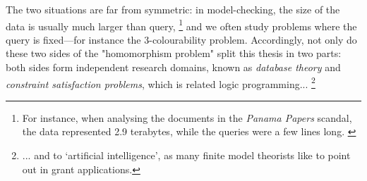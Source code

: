 The two situations are far from symmetric: in model-checking, the size of the
data is usually much larger than query,%
\footnote{For instance, when analysing the documents in the \emph{Panama Papers} scandal,
the data represented 2.9 terabytes, while the queries were a few lines long. \cite{Neo4jPanama}}
and we often study problems where
the query is fixed---for instance the 3-colourability problem.
Accordingly, not only do these two sides of the "homomorphism problem" split this thesis
in two parts: both sides form independent research domains, known as \emph{database theory}
and \emph{constraint satisfaction problems}, which is related logic programming...%
\footnote{... and to `artificial intelligence', as many finite model theorists
like to point out in grant applications.}


